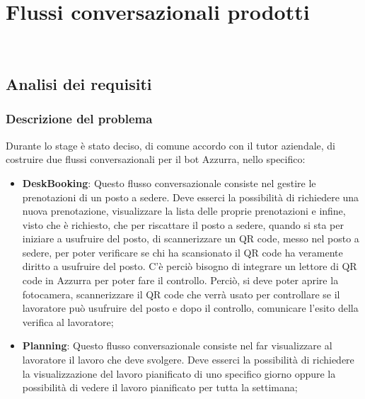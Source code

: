 
\chapter{Flussi conversazionali prodotti}
\label{cap:flussi di conversazione}

\\

\section{Analisi dei requisiti}
\subsection{Descrizione del problema}
Durante lo stage è stato deciso, di comune accordo con il tutor aziendale, di costruire due flussi conversazionali per il \gls{bot}\ap{[G]} Azzurra, nello specifico:
\begin{itemize}
	\item \textbf{DeskBooking}: Questo flusso conversazionale consiste nel gestire le prenotazioni di un posto a sedere. Deve esserci la possibilità di richiedere una nuova prenotazione, visualizzare la lista delle proprie prenotazioni e infine, visto che è richiesto, che per riscattare il posto a sedere, quando si sta per iniziare a usufruire del posto, di scannerizzare un \gls{QR code}\ap{[g]}, messo nel posto a sedere, per poter verificare se chi ha scansionato il \gls{QR code}\ap{[g]} ha veramente diritto a usufruire del posto. C'è perciò bisogno di integrare un lettore di \gls{QR code}\ap{[g]} in Azzurra per poter fare il controllo. Perciò, si deve poter aprire la fotocamera, scannerizzare il \gls{QR code}\ap{[g]} che verrà usato per controllare se il lavoratore può usufruire del posto e dopo il controllo, comunicare l'esito della verifica al lavoratore;
	\item \textbf{Planning}: Questo flusso conversazionale consiste nel far visualizzare al lavoratore il lavoro che deve svolgere. Deve esserci la possibilità di richiedere la visualizzazione del lavoro pianificato di uno specifico giorno oppure la possibilità di vedere il lavoro pianificato per tutta la settimana;
\end{itemize}
